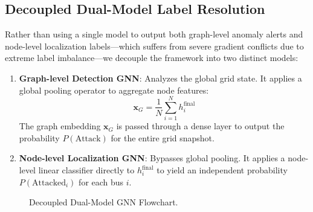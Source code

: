 \documentclass[10pt, a4paper, twocolumn]{article}
\begin{document}
\subsection{Decoupled Dual-Model Label Resolution}
Rather than using a single model to output both graph-level anomaly alerts and node-level localization labels—which suffers from severe gradient conflicts due to extreme label imbalance—we decouple the framework into two distinct models:
\begin{enumerate}
    \item \textbf{Graph-level Detection GNN}: Analyzes the global grid state. It applies a global pooling operator to aggregate node features:
    \begin{equation}
    \mathbf{x}_G = \frac{1}{N} \sum_{i=1}^N h^{\text{final}}_i
    \end{equation}
    The graph embedding $\mathbf{x}_G$ is passed through a dense layer to output the probability $P(\text{Attack})$ for the entire grid snapshot.
    \item \textbf{Node-level Localization GNN}: Bypasses global pooling. It applies a node-level linear classifier directly to $h^{\text{final}}_i$ to yield an independent probability $P(\text{Attacked}_i)$ for each bus $i$.
\end{enumerate}

\begin{figure}[t]
    \centering
    \caption{Decoupled Dual-Model GNN Flowchart.}
\end{figure}
\end{document}

